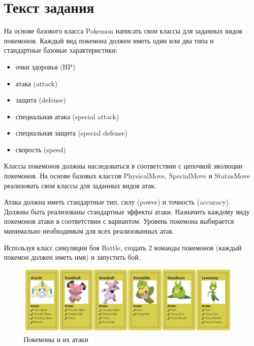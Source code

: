 \section{Текст задания}
На основе базового класса Pokemon написать свои классы для заданных видов покемонов.
Каждый вид покемона должен иметь один или два типа и стандартные базовые характеристики:

\begin{itemize}
\item очки здоровья (HP)
\item атака (attack)
\item защита (defense)
\item специальная атака (special attack)
\item специальная защита (special defense)
\item скорость (speed)
\end{itemize}

Классы покемонов должны наследоваться в соответствии с цепочкой эволюции покемонов.
На основе базовых классов PhysicalMove, SpecialMove и StatusMove реализовать свои классы для заданных видов атак.

Атака должна иметь стандартные тип, силу (power) и точность (accuracy).
Должны быть реализованы стандартные эффекты атаки. Назначить каждому
виду покемонов атаки в соответствии с вариантом.
Уровень покемона выбирается минимально необходимым для всех реализованных атак.

Используя класс симуляции боя Battle, создать 2 команды покемонов (каждый покемон должен иметь имя) и запустить бой.

\begin{figure}[ht]
    \centering
    \includegraphics[scale=0.55]{img/task.png}
    \caption[]{Покемоны и их атаки}
\end{figure}